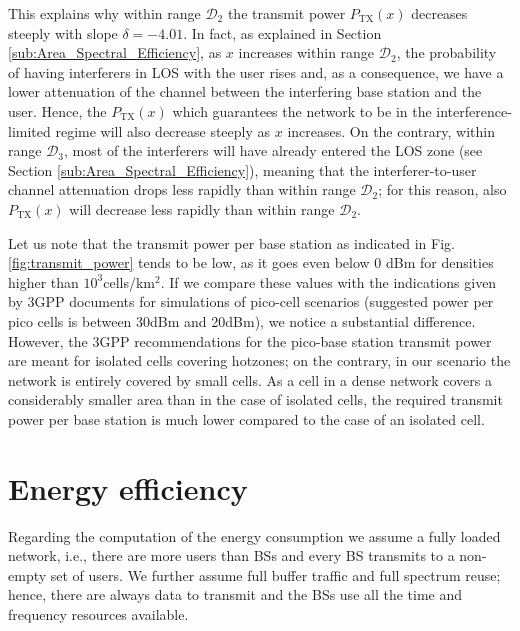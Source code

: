 \documentclass[twocoumn]{IEEEtran}
\begin{document}
This explains why within range  $\mathcal{D}_{\mathrm{2}}$ the transmit power $P_{\mathrm{TX}}(x)$ decreases steeply with slope $\delta=-4.01$. In fact, as explained in Section \ref{sub:Area_Spectral_Efficiency}, as $x$ increases within range  $\mathcal{D}_{\mathrm{2}}$, the probability of having interferers in LOS with the user rises and, as a consequence, we have a lower attenuation of the channel between the interfering base station and the user.
Hence, the $P_{\mathrm{TX}}(x)$ which guarantees the network to be in the interference-limited regime will also decrease steeply as $x$ increases.
On the contrary, within range $\mathcal{D}_{\mathrm{3}}$, most of the interferers will have already entered the LOS zone (see Section \ref{sub:Area_Spectral_Efficiency}), meaning that the interferer-to-user channel attenuation drops less rapidly than within range $\mathcal{D}_{\mathrm{2}}$; for this reason, also $P_{\mathrm{TX}}(x)$ will decrease less rapidly than within range $\mathcal{D}_{\mathrm{2}}$.
  

Let us note that the transmit power per base station as indicated
in Fig. \ref{fig:transmit_power} tends to be low, as it goes
even below 0 dBm for densities higher than $10^{3}$cells/km$^{2}$.
If we compare these values with the indications given by 3GPP documents
\cite{3GPP36814} for simulations of pico-cell scenarios (suggested
power per pico cells is between 30dBm and 20dBm), we notice a substantial
difference. However, the 3GPP recommendations for the pico-base station
transmit power are meant for isolated cells covering hotzones; on
the contrary, in our scenario the network is entirely covered by small
cells. As a cell in a dense network  covers a considerably smaller
area than in the case of isolated cells, the required transmit power
per base station is much lower compared to the case of an isolated
cell. 


\section{Energy efficiency} \label{sec:Energy_Efficiency}

Regarding the computation of the energy consumption we assume a fully loaded network, i.e., there are more users than BSs and every BS transmits to a non-empty set of users. We further assume full buffer traffic and full spectrum reuse; hence, there are always data to transmit and the BSs use all the time and frequency resources available.  
\end{document}

